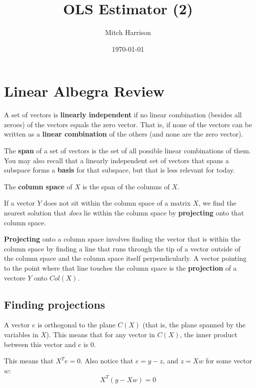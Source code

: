 \documentclass[titlepage, 12pt, leqno]{article}
\title{\Huge{OLS Estimator (2)}}
\author{\large{Mitch Harrison}}
\date{\today}
\begin{document}
\setlength{\parskip}{1\baselineskip}
\setlength{\parindent}{15pt}
\maketitle
\tableofcontents
\newpage


\section{Linear Albegra Review}

A set of vectors is \textbf{linearly independent} if no linear combination 
(besides all zeroes) of the vectors equals the zero vector. That is, if none of
the vectors can be written as a \textbf{linear combination} of the others (and
none are the zero vector).

The \textbf{span} of a set of vectors is the set of all possible linear 
combinations of them. You may also recall that a linearly independent set of
vectors that spans a subspace forms a \textbf{basis} for that subspace, but that
is less relevant for today.

The \textbf{column space} of $X$ is the span of the columns of $X$.

If a vector $Y$ does not sit within the column space of a matrix $X$, we find
the nearest solution that \textit{does} lie within the column space by
\textbf{projecting} onto that column space. 

\begin{definition}
    \textbf{Projecting} onto a column space involves finding the vector that is
    within the column space by finding a line that runs through the tip of a
    vector outside of the column space and the column space itself 
    perpendicularly. A vector pointing to the point where that line touches the
    column space is the \textbf{projection} of a vectore $Y$ onto $Col(X)$.
\end{definition}

\subsection{Finding projections}
A vector $e$ is orthogonal to the plane $C(X)$ (that is, the plane spanned by the
variables in $X$). This means that for any vector in $C(X)$, the inner product
between this vector and $e$ is 0.

This means that $X^Te =0$. Also notice that $e = y-z$, and $z = Xw$ for some 
vector $w$:
\[
    X^T(y-Xw) = 0
\]
\end{document}
